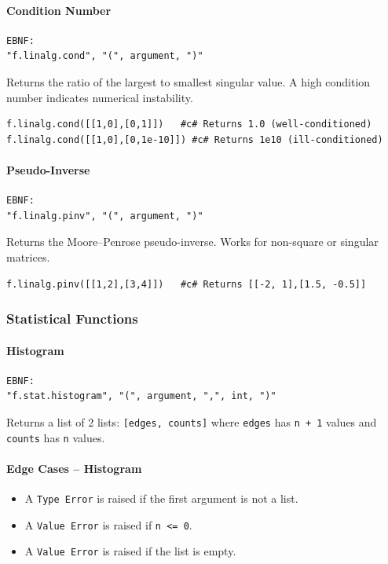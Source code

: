 \paragraph{Condition Number}
\begin{verbatim}
EBNF:
"f.linalg.cond", "(", argument, ")"
\end{verbatim}
Returns the ratio of the largest to smallest singular value. A high condition number indicates numerical instability.
\begin{verbatim}
f.linalg.cond([[1,0],[0,1]])   #c# Returns 1.0 (well-conditioned)
f.linalg.cond([[1,0],[0,1e-10]]) #c# Returns 1e10 (ill-conditioned)
\end{verbatim}

\paragraph{Pseudo-Inverse}
\begin{verbatim}
EBNF:
"f.linalg.pinv", "(", argument, ")"
\end{verbatim}
Returns the Moore--Penrose pseudo-inverse. Works for non-square or singular matrices.
\begin{verbatim}
f.linalg.pinv([[1,2],[3,4]])   #c# Returns [[-2, 1],[1.5, -0.5]]
\end{verbatim}

\subsubsection{Statistical Functions}
\paragraph{Histogram}
\begin{verbatim}
EBNF:
"f.stat.histogram", "(", argument, ",", int, ")"
\end{verbatim}
Returns a list of 2 lists: \texttt{[edges, counts]} where \texttt{edges} has \texttt{n + 1} values and \texttt{counts} has \texttt{n} values.

\paragraph{Edge Cases -- Histogram}
\begin{itemize}
\item A \texttt{Type Error} is raised if the first argument is not a list.
\item A \texttt{Value Error} is raised if \texttt{n <= 0}.
\item A \texttt{Value Error} is raised if the list is empty.
\end{itemize}

